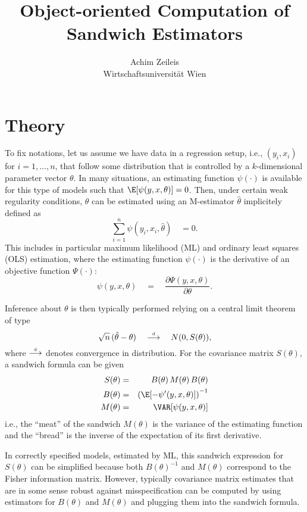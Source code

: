 \documentclass{Z}
\author{Achim Zeileis\\Wirtschaftsuniversit\"at Wien}
\title{Object-oriented Computation of Sandwich Estimators}
\newcommand{\darrow}{\stackrel{\mbox{\tiny \textnormal{d}}}{\longrightarrow}}
\begin{document}


\section{Theory}

To fix notations, let us assume we have data in a regression setup, i.e., 
$(y_i, x_i)$ for $i = 1, \dots, n$, that follow some distribution that is 
controlled by a $k$-dimensional parameter vector $\theta$. In many situations,
an estimating function $\psi(\cdot)$ is available for this type of models
such that $\E[\psi(y, x, \theta)] = 0$. Then, under certain weak regularity
conditions, $\theta$ can be estimated using an M-estimator $\hat \theta$
implicitely defined as
  \begin{equation}
    \sum_{i = 1}^n \psi(y_i, x_i, \hat \theta) \quad = 0.
  \end{equation}
This includes in particular maximum likelihood (ML) and ordinary least
squares (OLS) estimation, where the estimating function $\psi(\cdot)$ is
the derivative of an objective function $\Psi(\cdot)$:
  \begin{equation}
    \psi(y, x, \theta) \quad = \quad \frac{\partial \Psi(y, x, \theta)}{\partial \theta}.
  \end{equation}

Inference about $\theta$ is then typically performed relying on a central
limit theorem of type
  \begin{equation}
    \sqrt{n} \, (\hat \theta - \theta) \quad \darrow \quad N(0, S(\theta)),
  \end{equation}
where $\darrow$ denotes convergence in distribution. For the covariance matrix
$S(\theta)$, a sandwich formula can be given
\begin{eqnarray}
  S(\theta) & = & B(\theta) \, M(\theta) \, B(\theta) \\
  B(\theta) & = & \left( \E[ - \psi'(y, x, \theta) ] \right)^{-1} \\
  M(\theta) & = & \VAR[ \psi(y, x, \theta) ]
\end{eqnarray}
i.e., the ``meat'' of the sandwich $M(\theta)$ is the variance of the estimating
function and the ``bread'' is the inverse of the expectation of its first derivative.

In correctly specified models, estimated by ML, this sandwich expression for
$S(\theta)$ can be simplified because both $B(\theta)^{-1}$ and $M(\theta)$ correspond
to the Fisher information matrix. However, typically covariance matrix estimates that
are in some sense robust against misspecification can be computed by using estimators for
$B(\theta)$ and $M(\theta)$ and plugging them into the sandwich formula.
\end{document}
